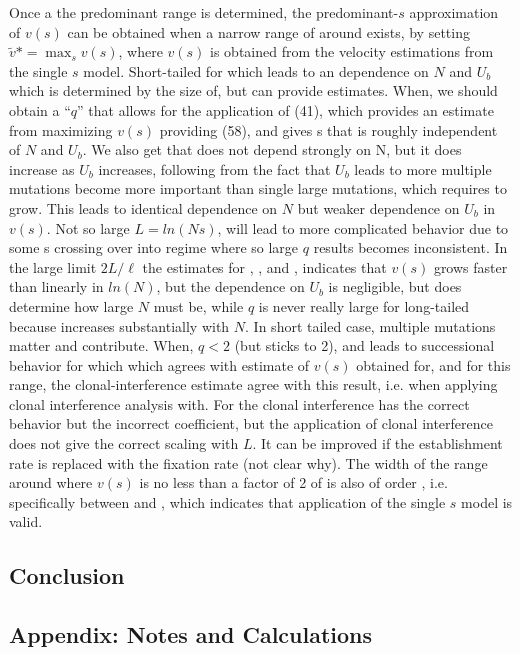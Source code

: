 \documentclass[12pt]{article}
\begin{document}
Once a the predominant range is determined, the predominant-$s$ approximation of $v(s)$ can be obtained when a narrow range of around exists, by setting $\tilde{v}* = \max_{s} v(s)$, where $v(s)$ is obtained from the velocity estimations from the single $s$ model.  Short-tailed for which leads to an dependence on $N$ and $U_b$ which is determined by  the size of, but can provide estimates.  When, we should obtain a “$q$” that allows for the application of (41), which provides an estimate  from maximizing $v(s)$ providing (58), and gives s that is roughly independent of $N$ and $U_b$.  We also get that does not depend strongly on N, but it does increase as $U_b$ increases, following from the fact that $U_b$ leads to more multiple mutations become more important than single large mutations, which requires to grow.  This leads to identical dependence on $N$ but weaker dependence on $U_b$ in $v(s)$.  Not so large $L=ln(Ns)$, will lead to more complicated behavior due to some s crossing over into regime where so large $q$ results becomes inconsistent.  In the large limit $2L/\ell$ the estimates for , , and , indicates that $v(s)$ grows faster than linearly in $ln(N)$, but the dependence on $U_b$ is negligible, but does determine how large $N$ must be, while $q$ is never really large for long-tailed because  increases substantially with $N$.  In short tailed case, multiple mutations matter and contribute.  When, $q<2$ (but sticks to 2), and leads to successional behavior for which which agrees with estimate of $v(s)$ obtained for, and for this range, the clonal-interference estimate agree with this result, i.e. when applying clonal interference analysis with.  
For the clonal interference has the correct behavior but the incorrect coefficient, but the application of clonal interference does not give the correct scaling with $L$.  It can be improved if the establishment rate is replaced with the fixation rate (not clear why).  The width of the range around where $v(s)$ is no less than a factor of 2 of is also of order , i.e. specifically between and , which indicates that application of the single $s$ model is valid.

\subsection*{Conclusion}


\subsection*{Appendix: Notes and Calculations}
\end{document}
